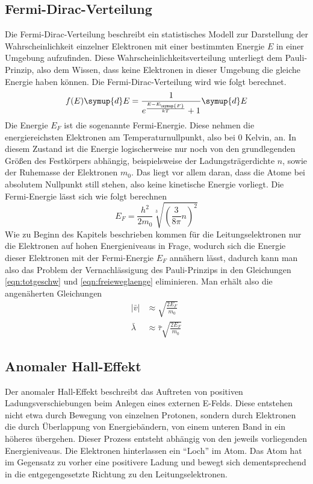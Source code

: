 \subsection{Fermi-Dirac-Verteilung}
\label{sec:fermidirac}
Die Fermi-Dirac-Verteilung beschreibt ein statistisches Modell zur Darstellung der Wahrscheinlichkeit einzelner Elektronen mit einer bestimmten Energie $E$
in einer Umgebung aufzufinden. Diese Wahrscheinlichkeitsverteilung unterliegt dem Pauli-Prinzip, also dem Wissen, dass keine Elektronen in dieser Umgebung die gleiche Energie haben können.
Die Fermi-Dirac-Verteilung wird wie folgt berechnet.
\begin{equation}
\label{eqn:fermidiraceq}
f(E)\symup{d}E = \frac{1}{e^{\frac{E-E_{\symup{F}}}{kT}}+1} \symup{d}E
\end{equation}
Die Energie $E_{F}$ ist die sogenannte Fermi-Energie. Diese nehmen die energiereichsten Elektronen am Temperaturnullpunkt, also bei 0 Kelvin, an. 
In diesem Zustand ist die Energie logischerweise nur noch von den grundlegenden Größen des Festkörpers abhängig, beispielsweise der Ladungsträgerdichte $n$, sowie der Ruhemasse der Elektronen $m_{0}$.
Das liegt vor allem daran, dass die Atome bei absolutem Nullpunkt still stehen, also keine kinetische Energie vorliegt.
Die Fermi-Energie lässt sich wie folgt berechnen
\begin{equation}
\label{eqn:fermienergie}
E_{F} = \frac{h^{2}}{2 m_{0}} \sqrt[3]{\left( \frac{3}{8\pi} n \right)^{2}}
\end{equation}
Wie zu Beginn des Kapitels beschrieben kommen für die Leitungselektronen nur die Elektronen auf hohen Energieniveaus in Frage, wodurch sich die Energie dieser Elektronen
mit der Fermi-Energie $E_{F}$ annähern lässt, dadurch kann man also das Problem der Vernachlässigung des Pauli-Prinzips in den Gleichungen \eqref{eqn:totgeschw} und \eqref{eqn:freieweglaenge} eliminieren.
Man erhält also die angenäherten Gleichungen
\begin{align}
\label{eqn:totalgeschw}
\lvert \bar{v} \rvert &\approx \sqrt{\frac{2 E_{F}}{m_{0}}} \\
\label{eqn:mittfreierweg}
\bar{\lambda} &\approx \bar{\tau} \sqrt{\frac{2 E_{F}}{m_{0}}}
\end{align}

\subsection{Anomaler Hall-Effekt}
\label{sec:anomhall}
Der anomaler Hall-Effekt beschreibt das Auftreten von positiven Ladungsverschiebungen beim Anlegen eines externen E-Felds. Diese entstehen nicht etwa durch Bewegung von einzelnen Protonen, sondern durch Elektronen
die durch Überlappung von Energiebändern, von einem unteren Band in ein höheres übergehen. Dieser Prozess entsteht abhängig von den jeweils vorliegenden Energieniveaus.
Die Elektronen hinterlassen ein \enquote{Loch} im Atom. Das Atom hat im Gegensatz zu vorher eine positivere Ladung und bewegt sich dementsprechend in die entgegengesetzte Richtung zu den Leitungselektronen.